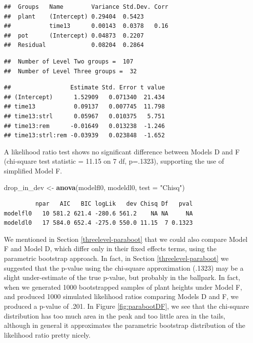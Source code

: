 \documentclass[
]{krantz}
\newenvironment{Shaded}{\begin{snugshade}}{\end{snugshade}}
\newcommand{\AttributeTok}[1]{\textcolor[rgb]{0.27,0.27,0.27}{#1}}
\newcommand{\FunctionTok}[1]{\textcolor[rgb]{0.27,0.27,0.27}{\textbf{#1}}}
\newcommand{\NormalTok}[1]{#1}
\newcommand{\OtherTok}[1]{\textcolor[rgb]{0.37,0.37,0.37}{#1}}
\newcommand{\StringTok}[1]{\textcolor[rgb]{0.5,0.5,0.5}{#1}}
\begin{document}
\begin{verbatim}
##  Groups   Name        Variance Std.Dev. Corr
##  plant    (Intercept) 0.29404  0.5423       
##           time13      0.00143  0.0378   0.16
##  pot      (Intercept) 0.04873  0.2207       
##  Residual             0.08204  0.2864
\end{verbatim}

\begin{verbatim}
##  Number of Level Two groups =  107 
##  Number of Level Three groups =  32
\end{verbatim}

\begin{verbatim}
##                 Estimate Std. Error t value
## (Intercept)      1.52909   0.071340  21.434
## time13           0.09137   0.007745  11.798
## time13:strl      0.05967   0.010375   5.751
## time13:rem      -0.01649   0.013238  -1.246
## time13:strl:rem -0.03939   0.023848  -1.652
\end{verbatim}

A likelihood ratio test shows no significant difference between Models D and F (chi-square test statistic = 11.15 on 7 df, p=.1323), supporting the use of simplified Model F.

\begin{Shaded}
\begin{Highlighting}[]
\NormalTok{drop\_in\_dev }\OtherTok{\textless{}{-}} \FunctionTok{anova}\NormalTok{(modelfl0, modeldl0, }\AttributeTok{test =} \StringTok{"Chisq"}\NormalTok{)}
\end{Highlighting}
\end{Shaded}

\begin{verbatim}
         npar   AIC   BIC logLik   dev Chisq Df   pval
modelfl0   10 581.2 621.4 -280.6 561.2    NA NA     NA
modeldl0   17 584.0 652.4 -275.0 550.0 11.15  7 0.1323
\end{verbatim}

We mentioned in Section \ref{threelevel-paraboot} that we could also compare Model F and Model D, which differ only in their fixed effects terms, using the parametric bootstrap approach. In fact, in Section \ref{threelevel-paraboot} we suggested that the p-value using the chi-square approximation (.1323) may be a slight under-estimate of the true p-value, but probably in the ballpark. In fact, when we generated 1000 bootstrapped samples of plant heights under Model F, and produced 1000 simulated likelihood ratios comparing Models D and F, we produced a p-value of .201. In Figure \ref{fig:parabootDF}, we see that the chi-square distribution has too much area in the peak and too little area in the tails, although in general it approximates the parametric bootstrap distribution of the likelihood ratio pretty nicely.
\end{document}
